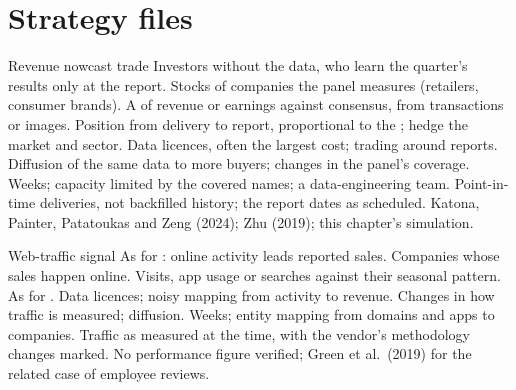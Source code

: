 \section{Strategy files}

\begin{strategyfile}{Revenue nowcast trade}\label{strat:s1:alternative-data-strategies:nowcast}
 Investors without the data, who learn the quarter's results only at the report.
 Stocks of companies the panel measures (retailers, consumer brands).
 A  of revenue or earnings against consensus, from transactions or images.
 Position from delivery to report, proportional to the ; hedge the market and sector.
 Data licences, often the largest cost; trading around reports.
 Diffusion of the same data to more buyers; changes in the panel's coverage.
 Weeks; capacity limited by the covered names; a data-engineering team.
 Point-in-time deliveries, not backfilled history; the report dates as scheduled.
 Katona, Painter, Patatoukas and Zeng (2024); Zhu (2019); this chapter's simulation.
\end{strategyfile}

\begin{strategyfile}{Web-traffic signal}\label{strat:s1:alternative-data-strategies:web}
 As for : online activity leads reported sales.
 Companies whose sales happen online.
 Visits, app usage or searches against their seasonal pattern.
 As for .
 Data licences; noisy mapping from activity to revenue.
 Changes in how traffic is measured; diffusion.
 Weeks; entity mapping from domains and apps to companies.
 Traffic as measured at the time, with the vendor's methodology changes marked.
 No performance figure verified; Green et al.\ (2019) for the related case of employee reviews.
\end{strategyfile}


